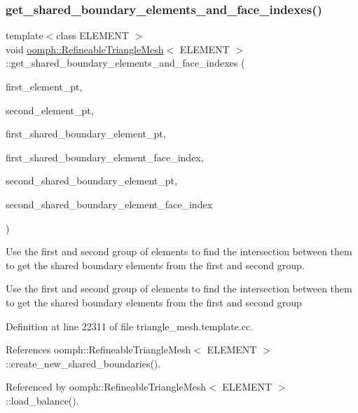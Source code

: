 \subsubsection{\texorpdfstring{get\+\_\+shared\+\_\+boundary\+\_\+elements\+\_\+and\+\_\+face\+\_\+indexes()}{get\_shared\_boundary\_elements\_and\_face\_indexes()}}
{\footnotesize\ttfamily template$<$class E\+L\+E\+M\+E\+NT $>$ \\
void \hyperlink{classoomph_1_1RefineableTriangleMesh}{oomph\+::\+Refineable\+Triangle\+Mesh}$<$ E\+L\+E\+M\+E\+NT $>$\+::get\+\_\+shared\+\_\+boundary\+\_\+elements\+\_\+and\+\_\+face\+\_\+indexes (\begin{DoxyParamCaption}\item[{const Vector$<$ Finite\+Element $\ast$$>$ \&}]{first\+\_\+element\+\_\+pt,  }\item[{const Vector$<$ Finite\+Element $\ast$$>$ \&}]{second\+\_\+element\+\_\+pt,  }\item[{Vector$<$ Finite\+Element $\ast$$>$ \&}]{first\+\_\+shared\+\_\+boundary\+\_\+element\+\_\+pt,  }\item[{Vector$<$ unsigned $>$ \&}]{first\+\_\+shared\+\_\+boundary\+\_\+element\+\_\+face\+\_\+index,  }\item[{Vector$<$ Finite\+Element $\ast$$>$ \&}]{second\+\_\+shared\+\_\+boundary\+\_\+element\+\_\+pt,  }\item[{Vector$<$ unsigned $>$ \&}]{second\+\_\+shared\+\_\+boundary\+\_\+element\+\_\+face\+\_\+index }\end{DoxyParamCaption})}



Use the first and second group of elements to find the intersection between them to get the shared boundary elements from the first and second group. 

Use the first and second group of elements to find the intersection between them to get the shared boundary elements from the first and second group 

Definition at line 22311 of file triangle\+\_\+mesh.\+template.\+cc.



References oomph\+::\+Refineable\+Triangle\+Mesh$<$ E\+L\+E\+M\+E\+N\+T $>$\+::create\+\_\+new\+\_\+shared\+\_\+boundaries().



Referenced by oomph\+::\+Refineable\+Triangle\+Mesh$<$ E\+L\+E\+M\+E\+N\+T $>$\+::load\+\_\+balance().

\mbox{\label{classoomph_1_1RefineableTriangleMesh_ab0a063a42df73f4c5bac4c120aa400d4}} 
